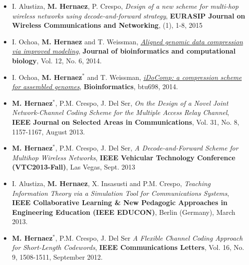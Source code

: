 \documentclass[11pt,a4paper,sans]{moderncv}        %
\begin{document}
\begin{itemize}
\item I. Alustiza, \textbf{M. Hernaez}, P. Crespo, {\emph{Design of a new scheme for multi-hop wireless networks using decode-and-forward strategy}}, \textbf{EURASIP Journal on Wireless Communications and Networking}, (1), 1-8, 2015\\

\item I. Ochoa, \textbf{M. Hernaez} and T. Weissman, \href{http://web.stanford.edu/~iochoa/publishedPublications/2014_cbc.pdf}{\emph{ Aligned genomic data compression via improved modeling}}, \textbf{Journal of bioinformatics and computational biology}, Vol. 12, No. 6, 2014.\\

\item I. Ochoa, \textbf{M. Hernaez}$^\ast$ and T. Weissman, \href{http://web.stanford.edu/~iochoa/publishedPublications/2014_idocomp_paper.pdf}{\emph{ iDoComp: a compression scheme for assembled genomes}}, \textbf{Bioinformatics}, btu698, 2014.\\

\item \textbf{M. Hernaez}$^\ast$, P.M. Crespo, J. {Del Ser}, {\emph{ On the Design of a Novel Joint Network-Channel Coding Scheme for the Multiple Access Relay Channel}}, \textbf{IEEE Journal on Selected Areas in Communications}, Vol. 31, No. 8, 1157-1167, August 2013.\\

\item \textbf{M. Hernaez}$^\ast$, P.M. Crespo, J. {Del Ser}, {\emph{A Decode-and-Forward Scheme for Multihop Wireless Networks}, \textbf{IEEE Vehicular Technology Conference (VTC2013-Fall)}}, Las Vegas, Sept. 2013\\

\item I. Alustiza, \textbf{M. Hernaez}, X. Insasusti and P.M. Crespo, {\emph{ Teaching Information Theory via a Simulation Tool for Communications Systems}}, \textbf{IEEE Collaborative Learning \& New Pedagogic Approaches in Engineering Education (IEEE EDUCON)}, Berlin (Germany), March  2013.\\

\item \textbf{M. Hernaez}$^\ast$, P.M. Crespo, J. {Del Ser} \emph{A Flexible Channel Coding Approach for Short-Length Codewords}, \textbf{IEEE Communications Letters}, Vol. 16, No. 9, 1508-1511, September 2012.\\


\end{itemize}
\end{document}
